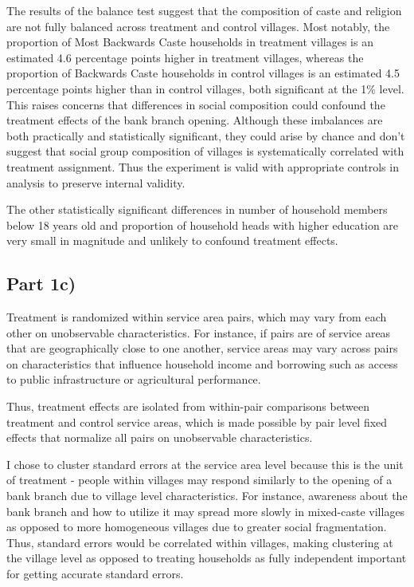 \documentclass[12pt]{article}
\begin{document}
The results of the balance test suggest that the composition of caste and religion are not fully balanced across treatment and control villages. Most notably, the proportion of Most Backwards Caste households in treatment villages is an estimated 4.6 percentage points higher in treatment villages, whereas the proportion of Backwards Caste households in control villages is an estimated 4.5 percentage points higher than in control villages, both significant at the 1\% level. This raises concerns that differences in social composition could confound the treatment effects of the bank branch opening. Although these imbalances are both practically and statistically significant, they could arise by chance and don't suggest that social group composition of villages is systematically correlated with treatment assignment. Thus the experiment is valid with appropriate controls in analysis to preserve internal validity.

The other statistically significant differences in number of household members below 18 years old and proportion of household heads with higher education are very small in magnitude and unlikely to confound treatment effects. 

\subsection*{Part 1c)}

Treatment is randomized within service area pairs, which may vary from each other on unobservable characteristics. For instance, if pairs are of service areas that are geographically close to one another, service areas may vary across pairs on characteristics that influence household income and borrowing such as access to public infrastructure or agricultural performance. 

Thus, treatment effects are isolated from within-pair comparisons between treatment and control service areas, which is made possible by pair level fixed effects that normalize all pairs on unobservable characteristics.

I chose to cluster standard errors at the service area level because this is the unit of treatment - people within villages may respond similarly to the opening of a bank branch due to village level characteristics. For instance, awareness about the bank branch and how to utilize it may spread more slowly in mixed-caste villages as opposed to more homogeneous villages due to greater social fragmentation. Thus, standard errors would be correlated within villages, making clustering at the village level as opposed to treating households as fully independent important for getting accurate standard errors.
\end{document}
